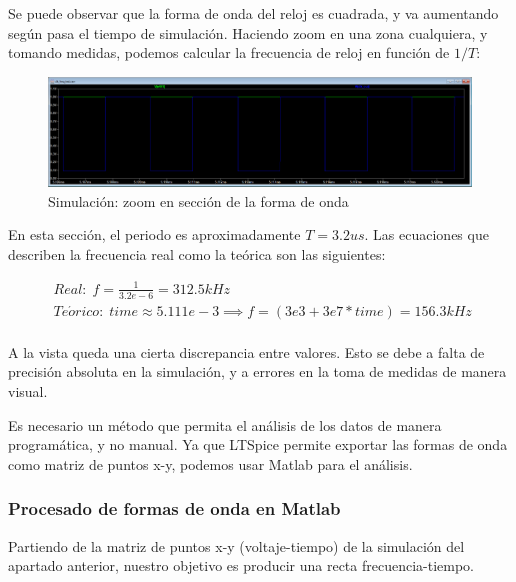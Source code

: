 \documentclass[12pt]{report} %
\begin{document}
	Se puede observar que la forma de onda del reloj es cuadrada, y va aumentando según pasa el tiempo de simulación. Haciendo zoom en una zona cualquiera, y tomando medidas, podemos calcular la frecuencia de reloj en función de $1/T$:

	\begin{figure}[H]
		\includegraphics[width=1\textwidth]{clk-freq-sim-waveform-zoom.PNG}
		\caption[Simulación: zoom en sección de la forma de onda]{Simulación: zoom en sección de la forma de onda}
		\label{fig:clk-freq-sim-waveform-zoom.PNG}
	\end{figure}
	
	En esta sección, el periodo es aproximadamente $T=3.2us$. Las ecuaciones que describen la frecuencia real como la teórica son las siguientes:
	
	\begin{figure}[H]
		\begin{equation} \label{eq:clk-freq_eqs_freq}
		\begin{array}{c}
		Real:\; f = \frac{1}{3.2e-6} = 312.5kHz \\
		Te\acute{o}rico:\; time\approx5.111e-3 \implies f = (3e3 + 3e7 * time) = 156.3kHz \\
		\end{array}
		\end{equation}
	\end{figure}

	A la vista queda una cierta discrepancia entre valores. Esto se debe a falta de precisión absoluta en la simulación, y a errores en la toma de medidas de manera visual.
	
	Es necesario un método que permita el análisis de los datos de manera programática, y no manual. Ya que LTSpice permite exportar las formas de onda como matriz de puntos x-y, podemos usar Matlab para el análisis.
	
	\subsubsection{Procesado de formas de onda en Matlab}
	
	Partiendo de la matriz de puntos x-y (voltaje-tiempo) de la simulación del apartado anterior, nuestro objetivo es producir una recta frecuencia-tiempo.
	
\end{document}
